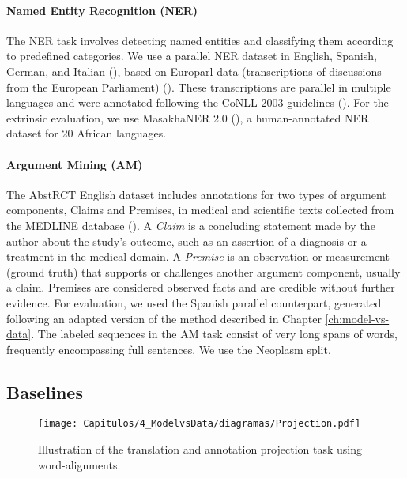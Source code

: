 \paragraph{Named Entity Recognition (NER)} The NER task involves detecting named entities and classifying them according to predefined categories. We use a parallel NER dataset in English, Spanish, German, and Italian (\cite{agerri-etal-2018-building}), based on Europarl data (transcriptions of discussions from the European Parliament) (\cite{DBLP:conf/mtsummit/Koehn05}). 
These transcriptions are parallel in multiple languages and were annotated following the CoNLL 2003 guidelines (\cite{DBLP:conf/conll/SangM03}). For the extrinsic evaluation, we use MasakhaNER 2.0 (\cite{adelani-etal-2022-masakhaner}), a human-annotated NER dataset for 20 African languages.




\paragraph{Argument Mining (AM)} The AbstRCT English dataset includes annotations for two types of argument components, Claims and Premises, in medical and scientific texts collected from the MEDLINE database (\cite{DBLP:conf/ecai/0002CV20}). A \textit{Claim} is a concluding statement made by the author about the study's outcome, such as an assertion of a diagnosis or a treatment in the medical domain. A \textit{Premise} is an observation or measurement (ground truth) that supports or challenges another argument component, usually a claim. Premises are considered observed facts and are credible without further evidence. For evaluation, we used the Spanish parallel counterpart, generated following an adapted version of the method described in Chapter \ref{ch:model-vs-data}. The labeled sequences in the AM task consist of very long spans of words, frequently encompassing full sentences. We use the Neoplasm split.




\subsection{Baselines}

\begin{wrapfigure}{r}{0.46\textwidth}
    \vspace{-0.95cm}
    \centering
    \texttt{[image: Capitulos/4\_ModelvsData/diagramas/Projection.pdf]}
    \caption{Illustration of the translation and annotation projection task using word-alignments.}
    \label{fig:projection_with_alignments}
    \vspace{-0.5cm}
\end{wrapfigure}


